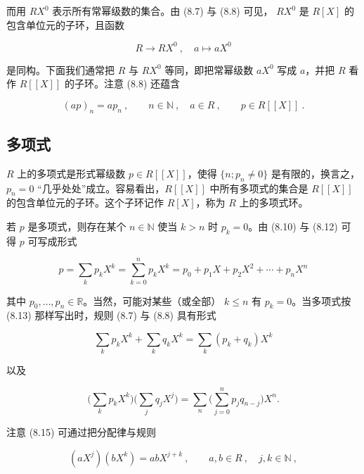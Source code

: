 \begin{proposition}
而用  $ RX^{0} $ 表示所有常幂级数的集合。由 (8.7) 与 (8.8) 可见， $ RX^{0} $ 是 $ R[X] $ 的包含单位元的子环，且函数

\begin{equation}
R\to R X^{0}~,\quad a\mapsto a X^{0}
\end{equation}

是同构。下面我们通常把 $R$ 与 $RX^0$ 等同，即把常幂级数 $aX^0$ 写成 $a$，并把 $R$ 看作 $R[[X]]$ 的子环。注意 (8.8) 还蕴含

\begin{equation}
(a p)_{n}=a p_{n}~,\qquad n\in\mathbb{N}~,\quad a\in R~,\qquad p\in R[[X]]~.
\end{equation}
\end{proposition}

\subsection*{多项式}

$R$ 上的多项式是形式幂级数 $p \in R[[X]]$，使得 $\{n; p_n \neq 0\}$ 是有限的，换言之，$p_n = 0$ “几乎处处”成立。容易看出，$R[[X]]$ 中所有多项式的集合是 $R[[X]]$ 的包含单位元的子环。这个子环记作 $R[X]$，称为 $R$ 上的多项式环。

若 $p$ 是多项式，则存在某个 $n \in \mathbb{N}$ 使当 $k > n$ 时 $p_k = 0$。由 (8.10) 与 (8.12) 可得 $p$ 可写成形式

\begin{equation}
p=\sum_{k}p_{k}X^{k}=\sum_{k=0}^{n}p_{k}X^{k}=p_{0}+p_{1}X+p_{2}X^{2}+\cdots+p_{n}X^{n}
\end{equation}

其中  $ p_0, \ldots, p_n \in \mathbb{R} $。当然，可能对某些（或全部） $ k \leq n $ 有  $ p_k = 0 $。当多项式按 (8.13) 那样写出时，规则 (8.7) 与 (8.8) 具有形式

\begin{equation}
\sum_{k}p_{k}X^{k}+\sum_{k}q_{k}X^{k}=\sum_{k}(p_{k}+q_{k})X^{k}
\end{equation}

以及

\begin{equation}
\Big(\sum_{k}p_{k}X^{k}\Big)\Big(\sum_{j}q_{j}X^{j}\Big)=\sum_{n}\Big(\sum_{j=0}^{n}p_{j}q_{n-j}\Big)X^{n}.
\end{equation}

注意 (8.15) 可通过把分配律与规则

\[
(a X^{j})(b X^{k})=a b X^{j+k}~,\qquad a,b\in R~,\quad j,k\in\mathbb{N}~,
\]

